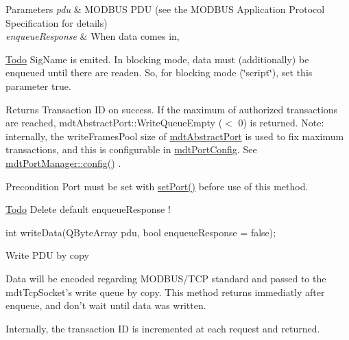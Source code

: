 \begin{DoxyParams}{Parameters}
{\em pdu} & MODBUS PDU (see the MODBUS Application Protocol Specification for details) \\
\hline
{\em enqueueResponse} & When data comes in,\\
\hline
\end{DoxyParams}
\begin{Desc}
\item[\hyperlink{todo__todo000021}{Todo}]SigName is emited. In blocking mode, data must (additionally) be enqueued until there are readen. So, for blocking mode (\char`\"{}script\char`\"{}), set this parameter true. \end{Desc}
\begin{DoxyReturn}{Returns}
Transaction ID on success. If the maximum of authorized transactions are reached, mdtAbstractPort::WriteQueueEmpty ($<$ 0) is returned. Note: internally, the writeFramesPool size of \hyperlink{classmdt_abstract_port}{mdtAbstractPort} is used to fix maximum transactions, and this is configurable in \hyperlink{classmdt_port_config}{mdtPortConfig}. See \hyperlink{classmdt_port_manager_a9cf3ea2da38f81682695b37448712ffd}{mdtPortManager::config()} . 
\end{DoxyReturn}
\begin{DoxyPrecond}{Precondition}
Port must be set with \hyperlink{classmdt_port_manager_afcd156b2d0c9d340999935efb6cd8cb6}{setPort()} before use of this method.
\end{DoxyPrecond}
\begin{Desc}
\item[\hyperlink{todo__todo000022}{Todo}]Delete default enqueueResponse ! \end{Desc}
int writeData(QByteArray pdu, bool enqueueResponse = false);

Write PDU by copy

Data will be encoded regarding MODBUS/TCP standard and passed to the mdtTcpSocket's write queue by copy. This method returns immediatly after enqueue, and don't wait until data was written.

Internally, the transaction ID is incremented at each request and returned.


